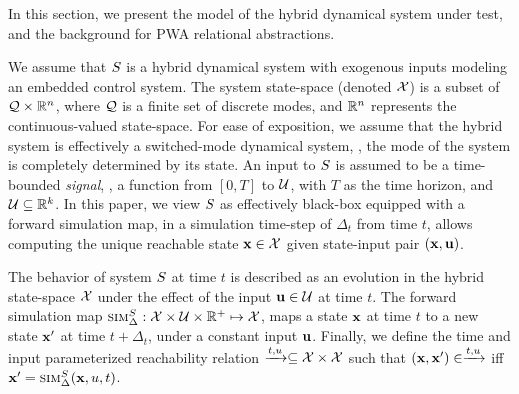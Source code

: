 In this section, we present the model of the hybrid dynamical system
under test, and the background for PWA relational abstractions.


We assume that $S$ is a hybrid dynamical system with exogenous
inputs modeling an embedded control system. The system state-space
(denoted $\mathcal{X}$) is a subset of $\mathcal{Q} \times \mathbb{R}^n$,
where $\mathcal{Q}$ is a finite set of discrete modes, and $\mathbb{R}^n$
represents the continuous-valued state-space. For ease of exposition,
we assume that the hybrid system is effectively a switched-mode
dynamical system, \ie, the mode of the system is completely determined
by its state.  An input to $S$ is assumed to be a time-bounded
{\em signal}, \ie, a function from $[0,T]$ to $\mathcal{U}$, with $T$ as
the time horizon, and $\mathcal{U} \subseteq \mathbb{R}^k$.  In this paper, we
view $S$ as effectively black-box equipped with a forward
simulation map, in a simulation time-step of $\Delta_t$ from time $t$,
allows computing the unique reachable state $\mathbf{x} \in \mathcal{X}$
given state-input pair $(\mathbf{x},\mathbf{u})$.  





\begin{definition}
    The behavior of system $S$ at time $t$ is described as an
    evolution in the hybrid state-space $\mathcal{X}$ under the
    effect of the input $\mathbf{u} \in \mathcal{U}$ at time $t$. The forward
    simulation map $\mbox{\sc sim}_\Delta^{S} : \mathcal{X} \times \mathcal{U}
    \times \mathbb{R}^+ \mapsto \mathcal{X}$, maps a state $\mathbf{x}$ at time
    $t$ to a new state $\mathbf{x}'$ at time $t+\Delta_t$, under a constant
    input $\mathbf{u}$.  Finally, we define the time and input parameterized
    reachability relation $\xrightarrow{t,u} \subseteq \mathcal{X} \times
    \mathcal{X}$ such that $(\mathbf{x},\mathbf{x}') \in \xrightarrow{t,u}$ iff
    $\mathbf{x}'=\mbox{\sc sim}_\Delta^{S}(\mathbf{x},u,t)$.
\end{definition}

